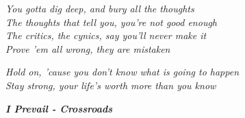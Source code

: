 \thispagestyle{empty}

\begin{flushright}
\textit{
You gotta dig deep, and bury all the thoughts \\
The thoughts that tell you, you're not good enough\\
The critics, the cynics, say you'll never make it\\
Prove 'em all wrong, they are mistaken\\
}

\medskip
\textit{Hold on, 'cause you don't know what is going to happen\\
Stay strong, your life's worth more than you know}

\bigskip

\textit{
\textbf{I Prevail - Crossroads}}

\end{flushright}